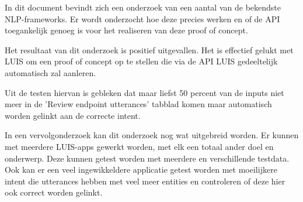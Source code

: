 In dit document bevindt zich een onderzoek van een aantal van de bekendste NLP-frameworks. Er wordt onderzocht hoe deze precies werken en of de API toegankelijk genoeg is voor het realiseren van deze proof of concept.

Het resultaat van dit onderzoek is positief uitgevallen. Het is effectief gelukt met LUIS om een proof of concept op te stellen die via de API LUIS gedeeltelijk automatisch zal aanleren.

Uit de testen hiervan is gebleken dat maar liefst 50 percent van de inputs niet meer in de 'Review endpoint utterances' tabblad komen maar automatisch worden gelinkt aan de correcte intent.

In een vervolgonderzoek kan dit onderzoek nog wat uitgebreid worden. Er kunnen met meerdere LUIS-apps gewerkt worden, met elk een totaal ander doel en onderwerp. Deze kunnen getest worden met meerdere en verschillende testdata. Ook kan er een veel ingewikkeldere applicatie getest worden met moeilijkere intent die utterances hebben met veel meer entities en controleren of deze hier ook correct worden gelinkt.